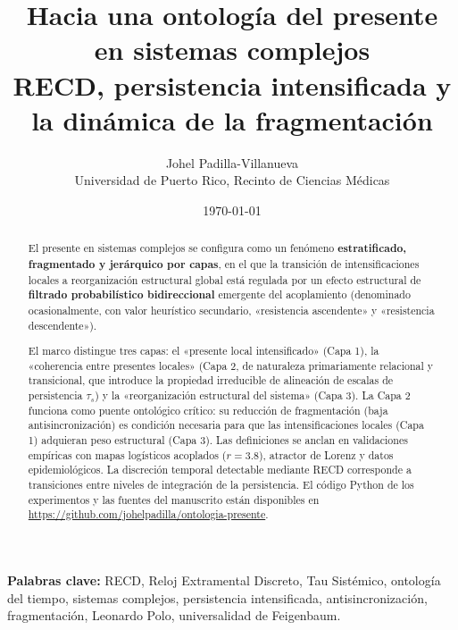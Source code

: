 \documentclass[11pt,a4paper]{article}
\title{\textbf{Hacia una ontología del presente en sistemas complejos}\\[0.3em]
\large RECD, persistencia intensificada y la dinámica de la fragmentación}
\author{Johel Padilla-Villanueva\\
\small Universidad de Puerto Rico, Recinto de Ciencias Médicas}
\date{\today}
\begin{document}
\maketitle

\begin{abstract}
El presente en sistemas complejos se configura como un fenómeno \textbf{estratificado, fragmentado y jerárquico por capas}, en el que la transición de intensificaciones locales a reorganización estructural global está regulada por un efecto estructural de \textbf{filtrado probabilístico bidireccional} emergente del acoplamiento (denominado ocasionalmente, con valor heurístico secundario, «resistencia ascendente» y «resistencia descendente»).

El marco distingue tres capas: el «presente local intensificado» (Capa 1), la «coherencia entre presentes locales» (Capa 2, de naturaleza primariamente relacional y transicional, que introduce la propiedad irreducible de alineación de escalas de persistencia $\tau_s$) y la «reorganización estructural del sistema» (Capa 3). La Capa 2 funciona como puente ontológico crítico: su reducción de fragmentación (baja antisincronización) es condición necesaria para que las intensificaciones locales (Capa 1) adquieran peso estructural (Capa 3). Las definiciones se anclan en validaciones empíricas con mapas logísticos acoplados ($r=3.8$), atractor de Lorenz y datos epidemiológicos. La discreción temporal detectable mediante RECD corresponde a transiciones entre niveles de integración de la persistencia.
El código Python de los experimentos y las fuentes del manuscrito están disponibles en \url{https://github.com/johelpadilla/ontologia-presente}.
\end{abstract}

\noindent\textbf{Palabras clave:} RECD, Reloj Extramental Discreto, Tau Sistémico, ontología del tiempo, sistemas complejos, persistencia intensificada, antisincronización, fragmentación, Leonardo Polo, universalidad de Feigenbaum.

\newpage
\tableofcontents
\newpage









\end{document}
